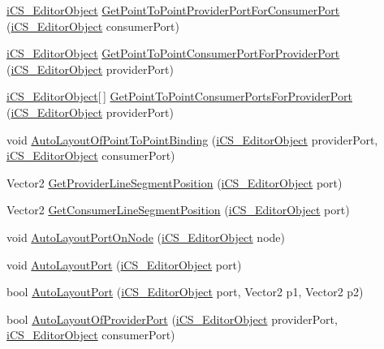 \begin{DoxyCompactItemize}
\item 
\hyperlink{classi_c_s___editor_object}{i\+C\+S\+\_\+\+Editor\+Object} \hyperlink{classi_c_s___i_storage_a0293be193519dd9c66632684b0ace8b6}{Get\+Point\+To\+Point\+Provider\+Port\+For\+Consumer\+Port} (\hyperlink{classi_c_s___editor_object}{i\+C\+S\+\_\+\+Editor\+Object} consumer\+Port)
\item 
\hyperlink{classi_c_s___editor_object}{i\+C\+S\+\_\+\+Editor\+Object} \hyperlink{classi_c_s___i_storage_a14728bb1fa79fdc264eb5b88015b4197}{Get\+Point\+To\+Point\+Consumer\+Port\+For\+Provider\+Port} (\hyperlink{classi_c_s___editor_object}{i\+C\+S\+\_\+\+Editor\+Object} provider\+Port)
\item 
\hyperlink{classi_c_s___editor_object}{i\+C\+S\+\_\+\+Editor\+Object}\mbox{[}$\,$\mbox{]} \hyperlink{classi_c_s___i_storage_a2cb72d6d05b1141b9ffe5d7e241e02eb}{Get\+Point\+To\+Point\+Consumer\+Ports\+For\+Provider\+Port} (\hyperlink{classi_c_s___editor_object}{i\+C\+S\+\_\+\+Editor\+Object} provider\+Port)
\item 
void \hyperlink{classi_c_s___i_storage_aba9b8c397adf4a4975ab910776fda66b}{Auto\+Layout\+Of\+Point\+To\+Point\+Binding} (\hyperlink{classi_c_s___editor_object}{i\+C\+S\+\_\+\+Editor\+Object} provider\+Port, \hyperlink{classi_c_s___editor_object}{i\+C\+S\+\_\+\+Editor\+Object} consumer\+Port)
\item 
Vector2 \hyperlink{classi_c_s___i_storage_ab8499196e67d1f9244d7be5ab9c05015}{Get\+Provider\+Line\+Segment\+Position} (\hyperlink{classi_c_s___editor_object}{i\+C\+S\+\_\+\+Editor\+Object} port)
\item 
Vector2 \hyperlink{classi_c_s___i_storage_ac95decd3d96df249a0f0f7b301f1d353}{Get\+Consumer\+Line\+Segment\+Position} (\hyperlink{classi_c_s___editor_object}{i\+C\+S\+\_\+\+Editor\+Object} port)
\item 
void \hyperlink{classi_c_s___i_storage_a09c615376d8249bb5f137df111848a0c}{Auto\+Layout\+Port\+On\+Node} (\hyperlink{classi_c_s___editor_object}{i\+C\+S\+\_\+\+Editor\+Object} node)
\item 
void \hyperlink{classi_c_s___i_storage_a10c9e9c0cfb3b4d7f816ff6c38982ded}{Auto\+Layout\+Port} (\hyperlink{classi_c_s___editor_object}{i\+C\+S\+\_\+\+Editor\+Object} port)
\item 
bool \hyperlink{classi_c_s___i_storage_aeb575f78167799c66f8916cb4766b98f}{Auto\+Layout\+Port} (\hyperlink{classi_c_s___editor_object}{i\+C\+S\+\_\+\+Editor\+Object} port, Vector2 p1, Vector2 p2)
\item 
bool \hyperlink{classi_c_s___i_storage_a543e8707e8349a8f8d660838d3ee4b98}{Auto\+Layout\+Of\+Provider\+Port} (\hyperlink{classi_c_s___editor_object}{i\+C\+S\+\_\+\+Editor\+Object} provider\+Port, \hyperlink{classi_c_s___editor_object}{i\+C\+S\+\_\+\+Editor\+Object} consumer\+Port)

\end{DoxyCompactItemize}
